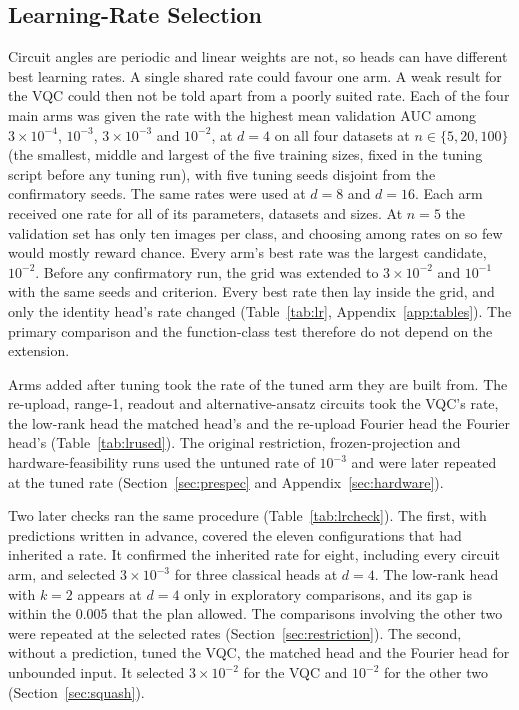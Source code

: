 \documentclass{ieeeaccess}
\newcommand{\vqc}{VQC}
\begin{document}
\subsection{Learning-Rate Selection}
\label{sec:lr}
Circuit angles are periodic and linear weights are not, so heads can have different best learning rates. A single shared rate could favour one arm. A weak result for the \vqc{} could then not be told apart from a poorly suited rate. Each of the four main arms was given the rate with the highest mean validation AUC among $3\times10^{-4}$, $10^{-3}$, $3\times10^{-3}$ and $10^{-2}$, at $d=4$ on all four datasets at $n\in\{5,20,100\}$ (the smallest, middle and largest of the five training sizes, fixed in the tuning script before any tuning run), with five tuning seeds disjoint from the confirmatory seeds. The same rates were used at $d=8$ and $d=16$. Each arm received one rate for all of its parameters, datasets and sizes. At $n=5$ the validation set has only ten images per class, and choosing among rates on so few would mostly reward chance. Every arm's best rate was the largest candidate, $10^{-2}$. Before any confirmatory run, the grid was extended to $3\times10^{-2}$ and $10^{-1}$ with the same seeds and criterion. Every best rate then lay inside the grid, and only the identity head's rate changed (Table~\ref{tab:lr}, Appendix~\ref{app:tables}). The primary comparison and the function-class test therefore do not depend on the extension.

Arms added after tuning took the rate of the tuned arm they are built from. The re-upload, range-1, readout and alternative-ansatz circuits took the \vqc{}'s rate, the low-rank head the matched head's and the re-upload Fourier head the Fourier head's (Table~\ref{tab:lrused}). The original restriction, frozen-projection and hardware-feasibility runs used the untuned rate of $10^{-3}$ and were later repeated at the tuned rate (Section~\ref{sec:prespec} and Appendix~\ref{sec:hardware}).

Two later checks ran the same procedure (Table~\ref{tab:lrcheck}). The first, with predictions written in advance, covered the eleven configurations that had inherited a rate. It confirmed the inherited rate for eight, including every circuit arm, and selected $3\times10^{-3}$ for three classical heads at $d=4$. The low-rank head with $k=2$ appears at $d=4$ only in exploratory comparisons, and its gap is within the 0.005 that the plan allowed. The comparisons involving the other two were repeated at the selected rates (Section~\ref{sec:restriction}). The second, without a prediction, tuned the \vqc{}, the matched head and the Fourier head for unbounded input. It selected $3\times10^{-2}$ for the \vqc{} and $10^{-2}$ for the other two (Section~\ref{sec:squash}).
\end{document}
